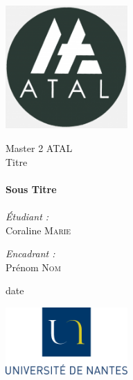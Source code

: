 
\begin{titlepage}
	\begin{center}

		\includegraphics[width=0.35\textwidth]{Figures/ATAL.png}~

		\LARGE{Master 2 \textsc{ATAL}}\\[1.5cm]

		\Large{Titre}\\[0.5cm]

		\HRule \\[0.4cm]
		{ \huge \bfseries Sous Titre \\[0.4cm] }
		\HRule \\[1.5cm]

		\normalsize		
		\emph{\'Etudiant :}\\
		Coraline \textsc{Marie}

		\vspace{0.5cm}

		\emph{Encadrant :} \\
		Prénom \textsc{Nom}

		\vspace{1cm}

		{\large date}

		\vfill

		
		\includegraphics[width=0.35\textwidth]{Figures/logoUN.png}~\\[2cm]

		

	\end{center}
\end{titlepage}

